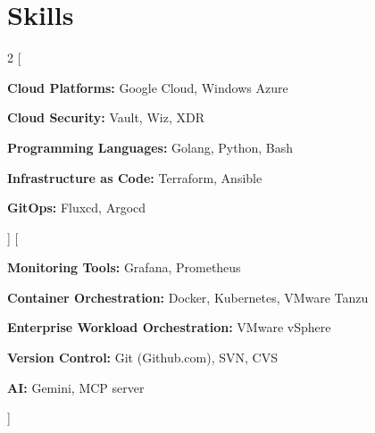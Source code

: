 \documentclass[11pt]{article}       %
\begin{document}
\section*{Skills}
\begin{multicols*}{2}
[
\begin{description}
\item\textbf{Cloud Platforms:} Google Cloud, Windows Azure
\vspace{-9.5pt}
\item\textbf{Cloud Security:} Vault, Wiz, XDR
\vspace{-9.5pt}
\item\textbf{Programming Languages:} Golang, Python, Bash
\vspace{-9.5pt}
\item\textbf{Infrastructure as Code:} Terraform, Ansible
\vspace{-9.5pt}
\item\textbf{GitOps:} Fluxcd, Argocd
\end{description}
]
[
\begin{description}
\item\textbf{Monitoring Tools:} Grafana, Prometheus
\vspace{-9.5pt}
\item\textbf{Container Orchestration:} Docker, Kubernetes, VMware Tanzu
\vspace{-9.5pt}
\item\textbf{Enterprise Workload Orchestration:} VMware vSphere
\vspace{-9.5pt}
\item\textbf{Version Control:} Git (Github.com), SVN, CVS
\vspace{-9.5pt}
\item\textbf{AI:} Gemini, MCP server
\end{description}
]
\end{multicols*}

\vspace{-18.5pt}

\end{document}
